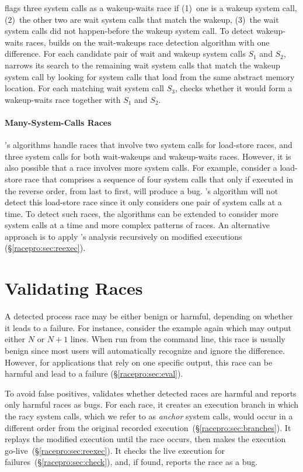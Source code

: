 \racepro flags three system calls as a wakeup-waits race if (1)~one is a
wakeup system call, (2)~the other two are wait system calls that match
the wakeup, (3)~the wait system calls did not happen-before
the wakeup system call. To detect wakeup-waits races, \racepro builds on
the wait-wakeups race detection algorithm with one difference.  For
each candidate pair of wait and wakeup system calls $S_1$ and 
$S_2$, \racepro narrows its search to the remaining wait system calls
that match the wakeup system call by looking for system calls that
load from the same abstract memory location.  For each matching wait
system call $S_3$, \racepro checks whether it would form a wakeup-waits
race together with $S_1$ and $S_2$.

\paragraph{Many-System-Calls Races} \label{racepro:sec:multilevel}

\racepro's algorithms handle races that involve two system calls for
load-store races, and three system calls for both wait-wakeups and
wakeup-waits races. However, it is also possible that a race involves
more system calls. For example, consider a load-store race that comprises
a sequence of four system calls that only if executed in the
reverse order, from last to first, will produce a bug.  \racepro's
algorithm will not detect this load-store race since it only
considers one pair of system calls at a time.  To detect such races,
the algorithms can be extended to consider more system calls at a time
and more complex patterns of races.  An alternative approach is to apply
\racepro's analysis recursively on modified executions
(\S\ref{racepro:sec:reexec}). 
\section{Validating Races}  \label{racepro:sec:validate}

A detected process race may be either benign or harmful, depending on
whether it leads to a failure.  For instance, consider the
 example again which may output either $N$ or $N+1$
lines.  When run from the command line, this race is usually benign since
most users will automatically recognize and ignore the difference.
However, for applications that rely on one specific output, this race can
be harmful and lead to a failure (\S\ref{racepro:sec:eval}).

To avoid false positives, \racepro validates whether detected races
are harmful and reports only harmful races as bugs.  
For each race, it creates an execution branch in which the racy system
calls, which we refer to as \emph{anchor} system calls, would occur in
a different order from the original recorded
execution~(\S\ref{racepro:sec:branches}). It replays the modified 
execution until the race occurs, then makes the execution
go-live~(\S\ref{racepro:sec:reexec}).  It checks the live execution for
failures~(\S\ref{racepro:sec:check}), and, if found, reports the race as a 
bug.

